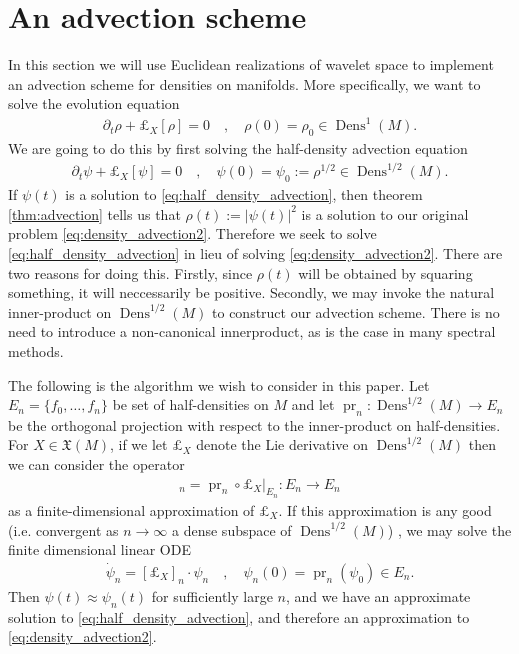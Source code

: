 \documentclass[a4paper, 12 pt]{amsart}
\DeclareMathOperator{\Dens}{Dens}
\DeclareMathOperator{\pr}{pr}
\begin{document}


\section{An advection scheme}
\label{sec:scheme}
   In this section we will use Euclidean realizations of wavelet space
   to implement an advection scheme for densities on manifolds.
   More specifically, we want to solve the evolution equation
   \begin{align}
     \partial_t \rho + \pounds_X[\rho] = 0 \quad , \quad 
     \rho(0) = \rho_0 \in \Dens^1(M). \label{eq:density_advection2}
   \end{align}
   We are going to do this by first solving the half-density advection
   equation
   \begin{align}
     \partial_t \psi + \pounds_X[\psi] = 0 \quad , \quad
     \psi(0) = \psi_0 := \rho^{1/2} \in \Dens^{1/2}(M). \label{eq:half_density_advection}
   \end{align}
   If $\psi(t)$ is a solution to \eqref{eq:half_density_advection}, then theorem \ref{thm:advection} tells us that $\rho(t) := |\psi(t)|^2$
   is a solution to our original problem \eqref{eq:density_advection2}.
   Therefore we seek to solve \eqref{eq:half_density_advection}
   in lieu of solving \eqref{eq:density_advection2}.
   There are two reasons for doing this.
   Firstly, since $\rho(t)$ will be obtained by squaring something,
   it will neccessarily be positive.
   Secondly, we may invoke the natural inner-product on $\Dens^{1/2}(M)$
   to construct our advection scheme.
   There is no need to introduce a non-canonical innerproduct, as is
   the case in many spectral methods.
   
   The following is the algorithm we wish to consider in this paper.
   Let $E_n = \{ f_0, \dots, f_n \}$ be set of half-densities on $M$
   and let $\pr_n : \Dens^{1/2}(M) \to E_n$ be the orthogonal projection
   with respect to the inner-product on half-densities.
   For $X \in \mathfrak{X}(M)$, if we let $\pounds_X$ denote the Lie 
   derivative on $\Dens^{1/2}(M)$ then we can consider the operator
   \begin{align*}
     [\pounds_X]_n = \pr_n \circ \left. \pounds_X \right|_{E_n} : 
     E_n \to E_n
   \end{align*}
   as a finite-dimensional approximation of $\pounds_X$.
   If this approximation is any good
   (i.e. convergent as $n \to \infty$ a dense subspace of $\Dens^{1/2}(M)$)
   , we may solve the finite dimensional
   linear ODE
   \begin{align*}
     \dot{\psi}_n = [\pounds_X]_n \cdot \psi_n \quad , \quad
     \psi_n(0) = \pr_n( \psi_0 ) \in E_n.
   \end{align*}
   Then $\psi(t) \approx \psi_n(t)$ for sufficiently large $n$,
   and we have an approximate solution to \eqref{eq:half_density_advection},
   and therefore an approximation to \eqref{eq:density_advection2}.
\end{document}
